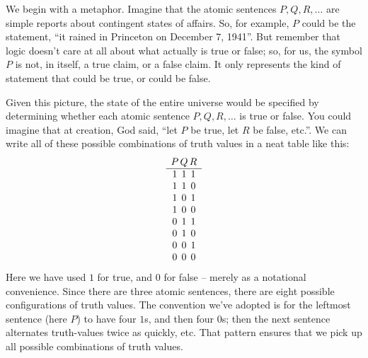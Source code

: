 We begin with a metaphor.  Imagine that the atomic sentences
$P,Q,R,\dots $ are simple reports about contingent states of affairs.
So, for example, $P$ could be the statement, ``it rained in Princeton
on December 7, 1941''.  But remember that logic doesn't care at all
about what actually is true or false; so, for us, the symbol $P$ is
not, in itself, a true claim, or a false claim.  It only represents
the kind of statement that could be true, or could be false.

Given this picture, the state of the entire universe would be
specified by determining whether each atomic sentence $P,Q,R,\dots $
is true or false.  You could imagine that at creation, God said, ``let
$P$ be true, let $R$ be false, etc.''.  We can write all of these
possible combinations of truth values in a neat table like this:
\[ \begin{array}{c@{\, }c@{\, }c}
     P & Q & R \\
     \hline 1 & 1 & 1 \\
     1 & 1 & 0 \\
     1 & 0 & 1 \\
     1 & 0 & 0 \\
     0 & 1 & 1 \\
     0 & 1 & 0 \\
     0 & 0 & 1 \\
     0 & 0 & 0 \end{array} \] Here we have used $1$ for true, and $0$
for false -- merely as a notational convenience.  Since there are three atomic sentences, there are eight possible configurations of truth values.  The convention we've adopted is for the leftmost sentence (here $P$) to have four $1$s, and then four $0$s; then the next sentence alternates truth-values twice as quickly, etc. That pattern ensures that we pick up all possible combinations of truth values.

